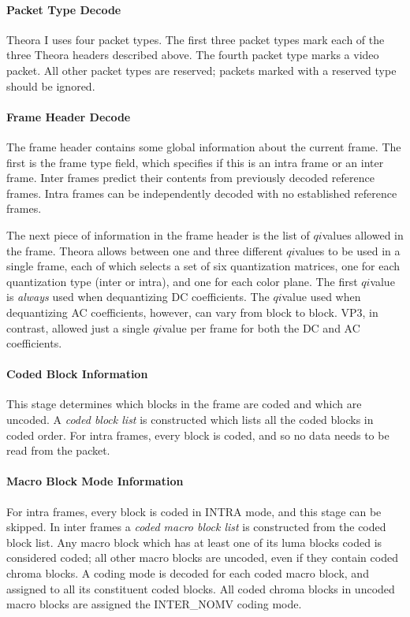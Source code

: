 \documentclass[11pt,letterpaper]{article}
\newcommand{\qi}{\ensuremath{\mathit{qi}}}
\newcommand{\term}[1]{{\em #1}}
\begin{document}
\paragraph{Packet Type Decode}

Theora I uses four packet types.
The first three packet types mark each of the three Theora headers described
 above.
The fourth packet type marks a video packet.
All other packet types are reserved; packets marked with a reserved type should
 be ignored.

\paragraph{Frame Header Decode}

The frame header contains some global information about the current frame.
The first is the frame type field, which specifies if this is an intra frame or
 an inter frame.
Inter frames predict their contents from previously decoded reference frames.
Intra frames can be independently decoded with no established reference frames.

The next piece of information in the frame header is the list of \qi values
 allowed in the frame.
Theora allows between one and three different \qi values to be used in a single
 frame, each of which selects a set of six quantization matrices, one for each
 quantization type (inter or intra), and one for each color plane.
The first \qi value is {\em always} used when dequantizing DC coefficients.
The \qi value used when dequantizing AC coefficients, however, can vary from
 block to block.
VP3, in contrast, allowed just a single \qi value per frame for both the DC and
 AC coefficients.

\paragraph{Coded Block Information}

This stage determines which blocks in the frame are coded and which are
 uncoded.
A \term{coded block list} is constructed which lists all the coded blocks in
 coded order.
For intra frames, every block is coded, and so no data needs to be read from
 the packet.

\paragraph{Macro Block Mode Information}

For intra frames, every block is coded in INTRA mode, and this stage can be
 skipped.
In inter frames a \term{coded macro block list} is constructed from the coded
 block list.
Any macro block which has at least one of its luma blocks coded is considered
 coded; all other macro blocks are uncoded, even if they contain coded chroma
 blocks.
A coding mode is decoded for each coded macro block, and assigned to all its
 constituent coded blocks.
All coded chroma blocks in uncoded macro blocks are assigned the INTER\_NOMV
 coding mode.
\end{document}

